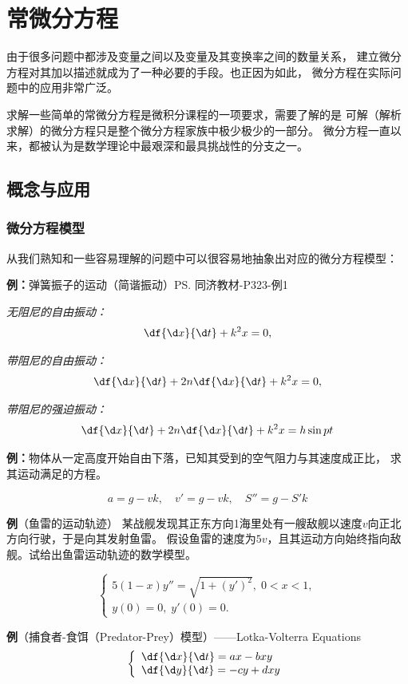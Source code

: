 \setcounter{chapter}{6}

\chapter{常微分方程}

由于很多问题中都涉及变量之间以及变量及其变换率之间的数量关系，
建立微分方程对其加以描述就成为了一种必要的手段。也正因为如此，
微分方程在实际问题中的应用非常广泛。

求解一些简单的常微分方程是微积分课程的一项要求，需要了解的是
可解（解析求解）的微分方程只是整个微分方程家族中极少极少的一部分。
微分方程一直以来，都被认为是数学理论中最艰深和最具挑战性的分支之一。


\section{概念与应用}

\subsection{微分方程模型}

从我们熟知和一些容易理解的问题中可以很容易地抽象出对应的微分方程模型：

{\bf 例：}弹簧振子的运动（简谐振动）\ps{同济教材-P323-例1}

{\it 无阻尼的自由振动：}
$$\df{\d x}{\d t}+k^2x=0,$$

{\it 带阻尼的自由振动：}
$$\df{\d x}{\d t}+2n\df{\d x}{\d t}+k^2x=0,$$

{\it 带阻尼的强迫振动：}
$$\df{\d x}{\d t}+2n\df{\d x}{\d t}+k^2x=h\sin pt$$

{\bf 例：}物体从一定高度开始自由下落，已知其受到的空气阻力与其速度成正比，
求其运动满足的方程。

$$a=g-vk,\quad v'=g-vk,\quad S''=g-S'k$$

{\bf 例}（鱼雷的运动轨迹）
某战舰发现其正东方向1海里处有一艘敌舰以速度$v$向正北方向行驶，于是向其发射鱼雷。
假设鱼雷的速度为$5v$，且其运动方向始终指向敌舰。试给出鱼雷运动轨迹的数学模型。

$$
	\left\{\begin{array}{l}
		5(1-x)y''=\sqrt{1+(y')^2},\;0<x<1,\\
		y(0)=0,\;y'(0)=0.
	\end{array}\right.
$$

{\bf 例}（捕食者-食饵（Predator-Prey）模型）——Lotka-Volterra Equations
$$
	\left\{\begin{array}{l}
		\df{\d x}{\d t}=ax-bxy\\
		\df{\d y}{\d t}=-cy+dxy
	\end{array}\right.
$$


